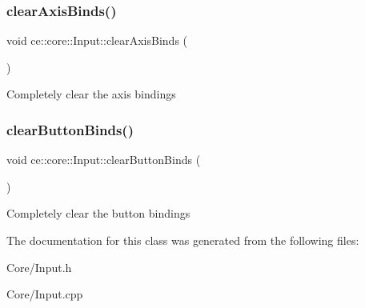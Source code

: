 \subsubsection{\texorpdfstring{clear\+Axis\+Binds()}{clearAxisBinds()}}
{\footnotesize\ttfamily void ce\+::core\+::\+Input\+::clear\+Axis\+Binds (\begin{DoxyParamCaption}{ }\end{DoxyParamCaption})}

Completely clear the axis bindings \mbox{\label{classce_1_1core_1_1_input_a84f905f6bd9f450d26fd23e1f8868dcb}} 
\subsubsection{\texorpdfstring{clear\+Button\+Binds()}{clearButtonBinds()}}
{\footnotesize\ttfamily void ce\+::core\+::\+Input\+::clear\+Button\+Binds (\begin{DoxyParamCaption}{ }\end{DoxyParamCaption})}

Completely clear the button bindings 

The documentation for this class was generated from the following files\+:\begin{DoxyCompactItemize}
\item 
Core/Input.\+h\item 
Core/Input.\+cpp\end{DoxyCompactItemize}
